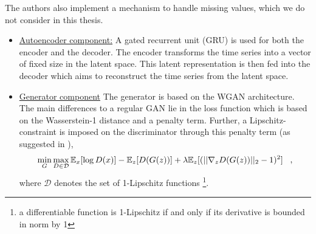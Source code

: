 The authors also implement a mechanism to handle missing values, which we do not consider in this thesis.
\begin{itemize}
    \item \underline{Autoencoder component:} A gated recurrent unit (GRU) is used for both the encoder and the decoder. The encoder transforms the time series into a vector of fixed size in the latent space. This latent representation is then fed into the decoder which aims to reconstruct the time series from the latent space.
    \item \underline{Generator component} The generator is based on the WGAN architecture. The main differences to a regular GAN lie in the loss function which is based on the Wasserstein-1 distance and a penalty term. Further, a Lipschitz-constraint is imposed on the discriminator through this penalty term (as suggested in \parencite{arjovsky2017wasserstein}),
    \begin{align} \label{eq:wgan_loss}
        \min_G \max_{D \in \mathcal{D}} \mathbb{E}_x[\log D(x)] - \mathbb{E}_z[D(G(z))] + \lambda \mathbb{E}_z [ (||\nabla_z D(G(z))||_2 - 1)^2] \;\;\;,
    \end{align}
    where $\mathcal{D}$ denotes the set of 1-Lipschitz functions \footnote[1]{a differentiable function is 1-Lipschitz if and only if its derivative is bounded in norm by 1}.
\end{itemize}